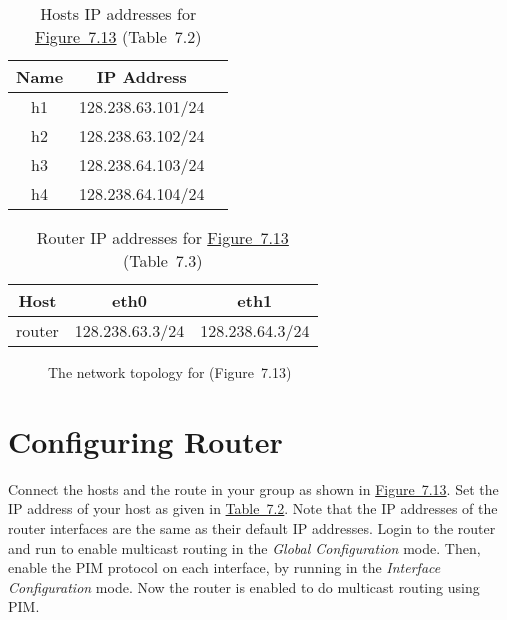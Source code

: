 \documentclass{../UTNetLab}
\begin{document}
\begin{table}[H]
    \caption{Hosts IP addresses for \hyperref[fig:7.13]{Figure~7.13} (Table~7.2)}
    \label{tab:7.2}
    \centering
    \begin{tabular}{ *3c }
        \hline \hline
        Name & IP Address        \\
        \hline
        h1   & 128.238.63.101/24 \\
        h2   & 128.238.63.102/24 \\
        h3   & 128.238.64.103/24 \\
        h4   & 128.238.64.104/24 \\
        \hline \hline
    \end{tabular}
\end{table}

\begin{table}[H]
    \caption{Router IP addresses for \hyperref[fig:7.13]{Figure~7.13} (Table~7.3)}
    \label{tab:7.3}
    \centering
    \begin{tabular}{ *3c }
        \hline \hline
        Host   & eth0            & eth1            \\
        \hline
        router & 128.238.63.3/24 & 128.238.64.3/24 \\
        \hline \hline
    \end{tabular}
\end{table}

\begin{figure}[H]
    \centering
    \caption{The network topology for  (Figure~7.13)}
    \label{fig:7.13}
\end{figure}

\section{Configuring Router}
\label{sec:config-router}
Connect the hosts and the route in your group as shown in \hyperref[fig:7.13]{Figure~7.13}.
Set the IP address of your host as given in \hyperref[tab:7.2]{Table~7.2}.
Note that the IP addresses of the router interfaces are the same as their default IP addresses.
Login to the router and run  to enable multicast routing in the \textit{Global Configuration} mode.
Then, enable the PIM protocol on each interface, by running  in the \textit{Interface Configuration} mode.
Now the router is enabled to do multicast routing using PIM.
\end{document}
